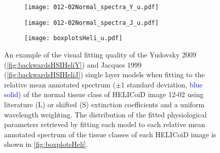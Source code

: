 \begin{figure}[h!]
    \centering
    \begin{subfigure}{0.49\textwidth}
        \texttt{[image: 012-02Normal\_spectra\_Y\_u.pdf]}
        \caption{}
        \label{fig:backwardsHSIHeliYuniform}
    \end{subfigure}
    \begin{subfigure}{0.49\textwidth}
        \texttt{[image: 012-02Normal\_spectra\_J\_u.pdf]}
        \caption{}
        \label{fig:backwardsHSIHeliJuniform}
    \end{subfigure}
    \begin{subfigure}{\textwidth}
        \texttt{[image: boxplotsHeli\_u.pdf]}
        \caption{}
        \label{fig:boxplotsHeliuniform}
    \end{subfigure}
    \caption{An example of the visual fitting quality of the Yudovsky 2009 (\ref{fig:backwardsHSIHeliY}) and Jacques 1999 (\ref{fig:backwardsHSIHeliJ}) single layer models when fitting to the relative mean annotated spectrum ($\pm$1 standard deviation, \textcolor{blue}{blue solid}) of the normal tissue class of HELICoiD image 12-02 using literature (L) or shifted (S) extinction coefficients and a uniform wavelength weighting. The distribution of the fitted physiological parameters retrieved by fitting each model to each relative mean annotated spectrum of the tissue classes of each HELICoiD image is shown in \ref{fig:boxplotsHeli}.}
    \label{fig:HELICoiDannuniform}
\end{figure}
